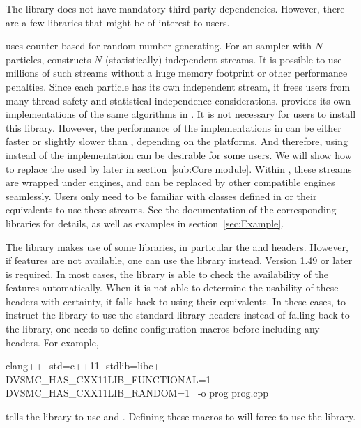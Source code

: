 \documentclass[11pt, fontset=Minion, showoverfull,
bib, mintcode, minted=cache]{marticle}
\begin{document}
The library does not have mandatory third-party dependencies. However, there
are a few libraries that might be of interest to users.

\vsmc uses \frandom \parencite{random} counter-based \rng for random number
generating. For an \smc sampler with $N$ particles, \vsmc constructs $N$
(statistically) independent \rng streams. It is possible to use millions of
such streams without a huge memory footprint or other performance penalties.
Since each particle has its own independent \rng stream, it frees users from
many thread-safety and statistical independence considerations. \vsmc provides
its own implementations of the same algorithms in \parencite{random}. It is
not necessary for users to install this library. However, the performance of
the implementations in \vsmc can be either faster or slightly slower than
\lrandom, depending on the platforms. And therefore, using \lrandom instead of
the \vsmc implementation can be desirable for some users. We will show how to
replace the \rng used by \vsmc later in section~\ref{sub:Core module}. Within
\vsmc, these \rng streams are wrapped under \cppoo \rng engines, and can be
replaced by other compatible \rng engines seamlessly. Users only need to be
familiar with classes defined in \cppoo {} or their \fboost
equivalents to use these \rng streams. See the documentation of the
corresponding libraries for details, as well as examples in
section~\ref{sec:Example}.

The library makes use of some \cppoo libraries, in particular the
 and  headers. However, if \cppoo
features are not available, one can use the \lboost library instead. Version
1.49 or later is required. In most cases, the library is able to check the
availability of the \cppoo features automatically. When it is not able to
determine the usability of these \cppoo headers with certainty, it falls back
to using their \lboost equivalents. In these cases, to instruct the library to
use the standard library headers instead of falling back to the \lboost
library, one needs to define configuration macros before including any \vsmc
headers. For example,
\begin{shcode}
clang++ -std=c++11 -stdlib=libc++        \
        -DVSMC_HAS_CXX11LIB_FUNCTIONAL=1 \
        -DVSMC_HAS_CXX11LIB_RANDOM=1     \
        -o prog prog.cpp
\end{shcode}
tells the library to use \cppoo {} and
\cppinline{<random>}. Defining these macros to  will force \vsmc
to use the \lboost library.
\end{document}
